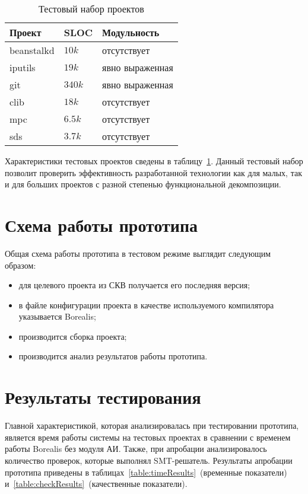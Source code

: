 \begin{table}
\caption{Тестовый набор проектов}
\begin{center}
\begin{tabular}{|l|l|l|}
\hline 
\textbf{Проект} & \textbf{SLOC} & \textbf{Модульность}  \\ 
\hline 
beanstalkd & $10k$ & отсутствует \\ 
\hline 
iputils & $19k$ & явно выраженная \\ 
\hline 
git & $340k$ & явно выраженная \\ 
\hline 
clib & $18k$ & отсутствует \\ 
\hline 
mpc & $6.5k$ & отсутствует \\ 
\hline 
sds & $3.7k$ & отсутствует \\ 
\hline 
\end{tabular} 
\end{center}
\label{table:testProjects}
\end{table}

Характеристики тестовых проектов сведены в таблицу~\ref{table:testProjects}. 
Дан­ный тестовый набор позволит проверить эффективность разработан­ной технологии 
как для малых, так и для больших проектов с разной степенью функциональной 
декомпозиции.

\section{Схема работы прототипа}
Общая схема работы прототипа в тестовом режиме выглядит сле­дующим образом:
\begin{itemize}
\item для целевого проекта из СКВ получается его последняя версия;
\item в файле конфигурации проекта в качестве используемого ком­пилятора 
указывается Borealis;
\item производится сборка проекта;
\item производится анализ результатов работы прототипа.
\end{itemize}

\section{Результаты тестирования}
Главной характеристикой, которая анализировалась при тестировании прототипа, 
является время работы системы на тестовых проектах в сравнении с временем
работы Borealis без модуля АИ. Также, при апробации анализировалось количество 
проверок, которые выполнял SMT-решатель. Результаты апробации прототипа 
приведены в таблицах~\ref{table:timeResults}~(временные показатели) и~\ref{table:checkResults}~(качественные показатели).

